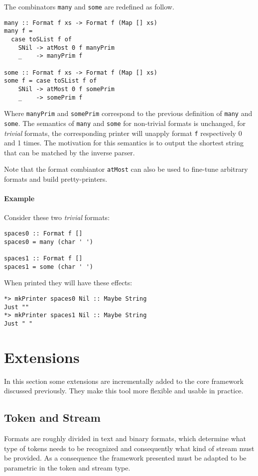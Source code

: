\documentclass[../Thesis.tex]{subfiles}
\begin{document}
The combinators \texttt{many} and \texttt{some} are redefined as follow.
\begin{verbatim}
many :: Format f xs -> Format f (Map [] xs)
many f = 
  case toSList f of
    SNil -> atMost 0 f manyPrim
    _    -> manyPrim f

some :: Format f xs -> Format f (Map [] xs)
some f = case toSList f of
    SNil -> atMost 0 f somePrim
    _    -> somePrim f
\end{verbatim}

Where \texttt{manyPrim} and \texttt{somePrim} correspond to the previous definition of \texttt{many} and \texttt{some}.
The semantics of \texttt{many} and \texttt{some} for non-trivial formats is unchanged, for \emph{trivial} formats, the corresponding printer will unapply 
format \texttt{f} respectively 0 and 1 times.
The motivation for this semantics is to output the shortest string that can be matched by the inverse parser.

Note that the format combiantor \texttt{atMost} can also be used to fine-tune arbitrary formats and build pretty-printers.

\paragraph{Example}
Consider these two \emph{trivial} formats:
\begin{verbatim}
spaces0 :: Format f []
spaces0 = many (char ' ')

spaces1 :: Format f []
spaces1 = some (char ' ')
\end{verbatim}

When printed they will have these effects:
\begin{verbatim}
*> mkPrinter spaces0 Nil :: Maybe String
Just ""
*> mkPrinter spaces1 Nil :: Maybe String
Just " "
\end{verbatim}

\section{Extensions}
In this section some extensions are incrementally added to the core framework discussed previously. They make this tool more flexible and usable in practice.

\subsection{Token and Stream}
Formats are roughly divided in text and binary formats, which determine what type of tokens needs to be recognized and consequently what kind of stream 
must be provided. As a consequence the framework presented must be adapted to be parametric in the token and stream type.
\end{document}

